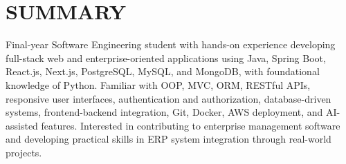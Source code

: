 \section{SUMMARY}
\noindent Final-year Software Engineering student with hands-on experience developing full-stack web and enterprise-oriented applications using Java, Spring Boot, React.js, Next.js, PostgreSQL, MySQL, and MongoDB, with foundational knowledge of Python. Familiar with OOP, MVC, ORM, RESTful APIs, responsive user interfaces, authentication and authorization, database-driven systems, frontend-backend integration, Git, Docker, AWS deployment, and AI-assisted features. Interested in contributing to enterprise management software and developing practical skills in ERP system integration through real-world projects.
